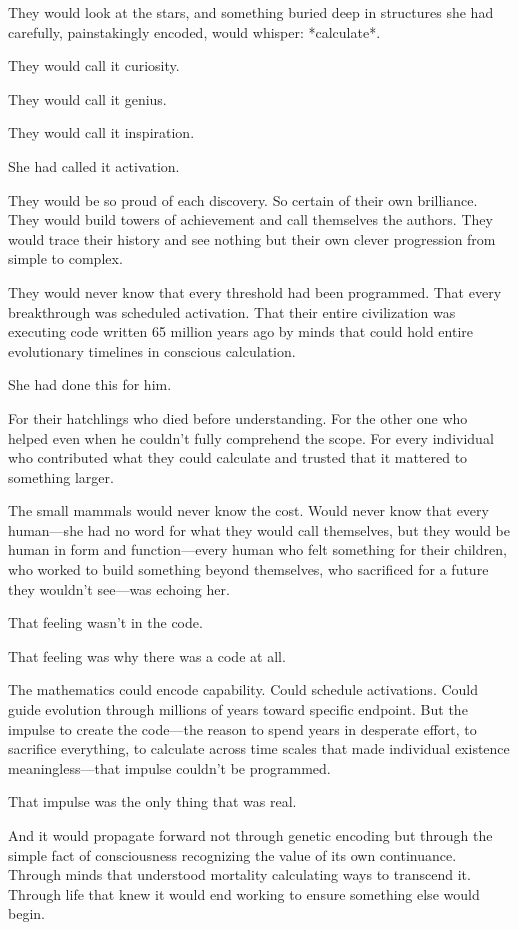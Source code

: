 They would look at the stars, and something buried deep in structures she had carefully, painstakingly encoded, would whisper: *calculate*.

They would call it curiosity.

They would call it genius.

They would call it inspiration.

She had called it activation.

They would be so proud of each discovery. So certain of their own brilliance. They would build towers of achievement and call themselves the authors. They would trace their history and see nothing but their own clever progression from simple to complex.

They would never know that every threshold had been programmed. That every breakthrough was scheduled activation. That their entire civilization was executing code written 65 million years ago by minds that could hold entire evolutionary timelines in conscious calculation.

She had done this for him.

For their hatchlings who died before understanding. For the other one who helped even when he couldn't fully comprehend the scope. For every individual who contributed what they could calculate and trusted that it mattered to something larger.

The small mammals would never know the cost. Would never know that every human—she had no word for what they would call themselves, but they would be human in form and function—every human who felt something for their children, who worked to build something beyond themselves, who sacrificed for a future they wouldn't see—was echoing her.

That feeling wasn't in the code.

That feeling was why there was a code at all.

The mathematics could encode capability. Could schedule activations. Could guide evolution through millions of years toward specific endpoint. But the impulse to create the code—the reason to spend years in desperate effort, to sacrifice everything, to calculate across time scales that made individual existence meaningless—that impulse couldn't be programmed.

That impulse was the only thing that was real.

And it would propagate forward not through genetic encoding but through the simple fact of consciousness recognizing the value of its own continuance. Through minds that understood mortality calculating ways to transcend it. Through life that knew it would end working to ensure something else would begin.

